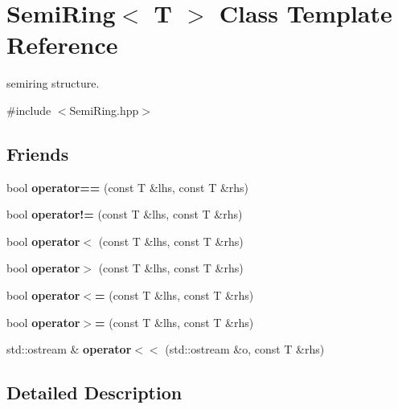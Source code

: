 \hypertarget{classSemiRing}{}\section{Semi\+Ring$<$ T $>$ Class Template Reference}
\label{classSemiRing}


semiring structure.  




{\ttfamily \#include $<$Semi\+Ring.\+hpp$>$}

\subsection*{Friends}
\begin{DoxyCompactItemize}
\item 
\mbox{\label{classSemiRing_ae55aaa8ab31c31ebc41b762886835b05}} 
bool {\bfseries operator==} (const T \&lhs, const T \&rhs)
\item 
\mbox{\label{classSemiRing_aa9434de986958333c8a4114e04b83f1a}} 
bool {\bfseries operator!=} (const T \&lhs, const T \&rhs)
\item 
\mbox{\label{classSemiRing_aac11d896996722c79e5333db4d716169}} 
bool {\bfseries operator$<$} (const T \&lhs, const T \&rhs)
\item 
\mbox{\label{classSemiRing_a55af6cb1ca766f6fba5fe1a6ff3d7b54}} 
bool {\bfseries operator$>$} (const T \&lhs, const T \&rhs)
\item 
\mbox{\label{classSemiRing_a3c5ac45ccee4dd4a74a67e6886309072}} 
bool {\bfseries operator$<$=} (const T \&lhs, const T \&rhs)
\item 
\mbox{\label{classSemiRing_a2cde4518a54e4900eac612f536e5303e}} 
bool {\bfseries operator$>$=} (const T \&lhs, const T \&rhs)
\item 
\mbox{\label{classSemiRing_a3e047b1e781f04f0ae954a6d57dd871b}} 
std\+::ostream \& {\bfseries operator$<$$<$} (std\+::ostream \&o, const T \&rhs)
\end{DoxyCompactItemize}


\subsection{Detailed Description}
